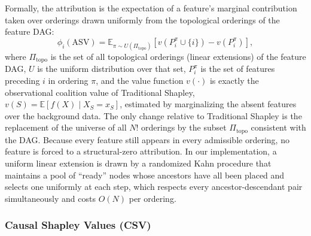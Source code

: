 \documentclass[12pt,a4paper,oneside]{article}
\begin{document}
Formally, the attribution is the expectation of a feature's marginal contribution taken over orderings drawn uniformly from the topological orderings of the feature DAG:
\begin{equation}
  \phi_i(\mathrm{ASV}) = \mathbb{E}_{\pi \sim U(\Pi_{\mathrm{topo}})}
  \left[ v(P_i^\pi \cup \{i\}) - v(P_i^\pi) \right],
\end{equation}
where $\Pi_{\mathrm{topo}}$ is the set of all topological orderings (linear extensions) of the feature DAG, $U$ is the uniform distribution over that set, $P_i^\pi$ is the set of features preceding $i$ in ordering $\pi$, and the value function $v(\cdot)$ is exactly the observational coalition value of Traditional Shapley, $v(S) = \mathbb{E}[f(X) \mid X_S = x_S]$, estimated by marginalizing the absent features over the background data. The only change relative to Traditional Shapley is the replacement of the universe of all $N!$ orderings by the subset $\Pi_{\mathrm{topo}}$ consistent with the DAG. Because every feature still appears in every admissible ordering, no feature is forced to a structural-zero attribution. In our implementation, a uniform linear extension is drawn by a randomized Kahn procedure that maintains a pool of ``ready'' nodes whose ancestors have all been placed and selects one uniformly at each step, which respects every ancestor-descendant pair simultaneously and costs $O(N)$ per ordering.

\subsubsection{Causal Shapley Values (CSV)}
\end{document}
